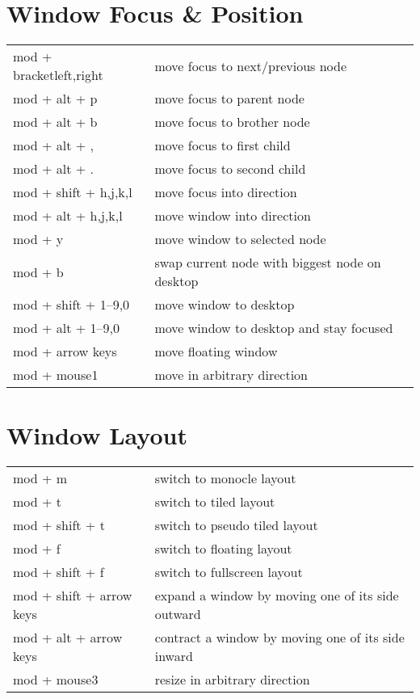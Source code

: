 \documentclass[
    10pt,
    a4paper,
    notitlepage,
]{scrartcl}
\begin{document}
\section{Window Focus \& Position}
\begin{tabular}{p{4cm}l}
    mod + bracket{left,right} & move focus to next/previous node               \\
    mod + alt + p             & move focus to parent node                      \\
    mod + alt + b             & move focus to brother node                     \\
    mod + alt + ,             & move focus to first child                      \\
    mod + alt + .             & move focus to second child                     \\
    mod + shift + h,j,k,l     & move focus into direction                      \\
    mod + alt + h,j,k,l       & move window into direction                     \\
    mod + y                   & move window to selected node                   \\
    mod + b                   & swap current node with biggest node on desktop \\
    mod + shift + 1--9,0      & move window to desktop                         \\
    mod + alt + 1--9,0        & move window to desktop and stay focused        \\
    mod + arrow keys          & move floating window                           \\
    mod + mouse1              & move in arbitrary direction
\end{tabular}

\section{Window Layout}
\begin{tabular}{p{4cm}l}
    mod + m                         & switch to monocle layout                           \\
    mod + t                         & switch to tiled layout                             \\
    mod + shift + t                 & switch to pseudo tiled layout                      \\
    mod + f                         & switch to floating layout                          \\
    mod + shift + f                 & switch to fullscreen layout                        \\
    mod + shift + arrow keys        & expand a window by moving one of its side outward  \\
    mod + alt + arrow keys          & contract a window by moving one of its side inward \\
    mod + mouse3                    & resize in arbitrary direction
\end{tabular}
\end{document}
